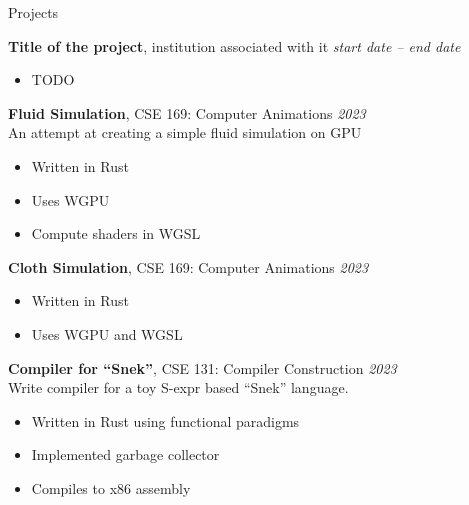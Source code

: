 	\begin{rSection}{Projects}

		{\bf Title of the project}{, institution associated with it} \hfill {\em start date -- end date}
		\begin{multicols}{2}
			\begin{itemize}
				\item TODO
			\end{itemize}
		\end{multicols}

		{\bf Fluid Simulation}{, CSE 169: Computer Animations} \hfill {\em 2023} \\
		An attempt at creating a simple fluid simulation on GPU
		\begin{multicols}{2}
			\begin{itemize}
				\item Written in Rust
				\item Uses WGPU
				\item Compute shaders in WGSL
			\end{itemize}
		\end{multicols}

		{\bf Cloth Simulation}{, CSE 169: Computer Animations} \hfill {\em 2023}
		\begin{multicols}{2}
			\begin{itemize}
				\item Written in Rust
				\item Uses WGPU and WGSL
			\end{itemize}
		\end{multicols}

		{\bf Compiler for ``Snek''}{, CSE 131: Compiler Construction} \hfill {\em 2023} \\
		Write compiler for a toy S-expr based ``Snek'' language.
		\begin{multicols}{2}
			\begin{itemize}
				\item Written in Rust using functional paradigms
				\item Implemented garbage collector
				\item Compiles to x86 assembly
			\end{itemize}
		\end{multicols}


\end{rSection}
